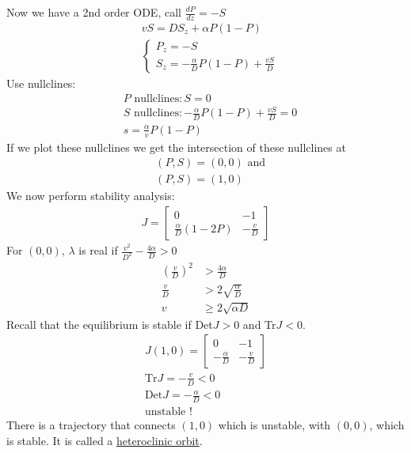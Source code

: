 \documentclass[12pt, letterpaper]{article}
\begin{document}
Now we have a 2nd order ODE, call $\frac{dP}{dz} = -S$
\begin{align*}
    &vS = D S_z + \alpha P(1-P) \\
    &\begin{cases}
        P_z = -S \\
        S_z = -\frac{\alpha}{D} P(1-P) + \frac{vS}{D}
    \end{cases}
\end{align*}
Use nullclines:
\begin{align*}
    &P \text{ nullclines}: S = 0 \\
    &S \text{ nullclines}:
        - \frac{\alpha}{D} P(1-P) + \frac{vS}{D} = 0 \\
    &s = \frac{\alpha}{v} P(1-P)
\end{align*}
If we plot these nullclines we get the intersection of these nullclines at 
\begin{align*}
    &(P,S) = (0,0) \text{ and} \\
    &(P,S) = (1,0) 
\end{align*}
We now perform stability analysis:
\begin{align*}
    J = \begin{bmatrix}
        0 & -1 \\
        \frac{\alpha}{D}(1-2P) & -\frac{v}{D}
    \end{bmatrix}
\end{align*}
For $(0,0)$, $\lambda$ is real if $\frac{v^2}{D^2} - \frac{4\alpha}{D} > 0$ 
\begin{align*}
    (\frac{v}{D})^2 &> \frac{4\alpha}{D} \\
    \frac{v}{D} &> 2\sqrt{\frac{\alpha}{D}} \\
    v &\ge 2\sqrt{\alpha D} \tag{$\ast$}
\end{align*}
Recall that the equilibrium is stable if Det$J > 0$ and Tr$J < 0$.
\begin{align*}
    J(1,0) = \begin{bmatrix}
        0 & -1 \\
        -\frac{\alpha}{D} & -\frac{v}{D}
    \end{bmatrix} \\
    \text{Tr}J = -\frac{v}{D} < 0 \\
    \text{Det}J = - \frac{\alpha}{D} < 0 \\
    \text{unstable !}
\end{align*}
There is a trajectory that connects $(1,0)$ which is unstable, with $(0,0)$, which
is stable. It is called a \underline{heteroclinic orbit}. 
\end{document}
